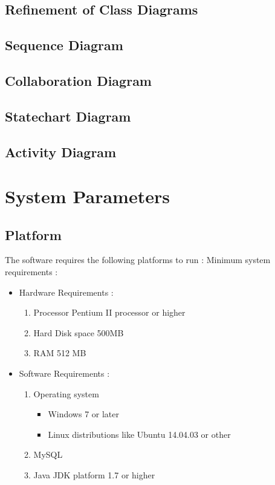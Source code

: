 \documentclass{article}
\begin{document}
\subsection{Refinement of Class Diagrams}
\subsection{Sequence Diagram}
\subsection{Collaboration Diagram}
\subsection{Statechart Diagram}
\subsection{Activity Diagram}

\section{System Parameters}
\subsection{Platform}
The software requires the following platforms to run :
Minimum system requirements :
\begin{itemize}
\item Hardware Requirements :
	\begin {enumerate}
	\item Processor Pentium II processor or higher
	\item Hard Disk space 500MB
	\item RAM 512 MB
	\end{enumerate}
\item Software Requirements :
	\begin{enumerate}
	\item Operating system
		\begin{itemize}
		\item  Windows 7 or later
		\item Linux distributions like Ubuntu 14.04.03 or other
		\end{itemize}
	\item MySQL
	\item Java JDK platform 1.7 or higher
	\end{enumerate}
\end {itemize}
\end{document}
